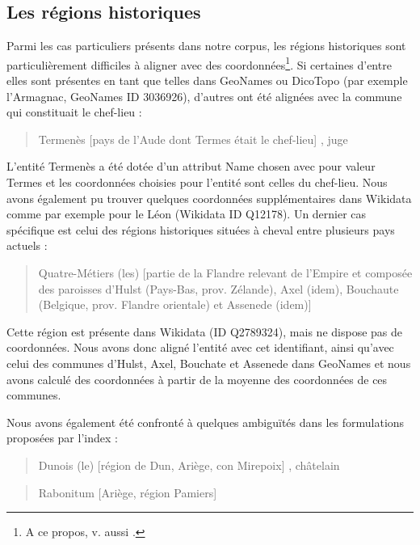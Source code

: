 \documentclass[a4paper,12pt,twoside]{book}
\begin{document}
	\subsection{Les régions historiques}
	
	Parmi les cas particuliers présents dans notre corpus, les régions historiques sont particulièrement difficiles à aligner avec des coordonnées\footnote{A ce propos, v. aussi \cite{mcdonough_named_2019}.}. Si certaines d'entre elles sont présentes en tant que telles dans GeoNames ou DicoTopo (par exemple l'Armagnac, GeoNames ID 3036926), d'autres ont été alignées avec la commune qui constituait le chef-lieu :
	
	\begin{quotation}
		Termenès [pays de l'Aude dont Termes était le chef-lieu] ,
		juge
	\end{quotation}

	\noindent L'entité \og Termenès\fg{} a été dotée d'un attribut \og Name chosen\fg{} avec pour valeur \og Termes\fg{} et les coordonnées choisies pour l'entité  sont celles du chef-lieu. Nous avons également pu trouver quelques coordonnées supplémentaires dans Wikidata comme par exemple pour le Léon (Wikidata ID  Q12178). Un dernier cas spécifique est celui des régions historiques situées à cheval entre plusieurs pays actuels :
	
	\begin{quotation}
		Quatre-Métiers (les) [partie de la Flandre relevant de l'Empire
		et composée des paroisses d'Hulst (Pays-Bas, prov. Zélande), Axel (idem),
		Bouchaute (Belgique, prov. Flandre orientale) et Assenede (idem)]
	\end{quotation}

	\noindent Cette région est présente dans Wikidata (ID Q2789324), mais ne dispose pas de coordonnées. Nous avons donc aligné l'entité avec cet identifiant, ainsi qu'avec celui des communes d'Hulst, Axel, Bouchate et Assenede dans GeoNames et nous avons calculé des coordonnées à partir de la moyenne des coordonnées de ces communes.
	
	Nous avons également été confronté à quelques ambiguïtés dans les formulations proposées par l'index :
	
	\begin{quotation}
		Dunois (le) [région de Dun, Ariège, con Mirepoix] ,
		châtelain
	\end{quotation}

	\begin{quotation}
		Rabonitum [Ariège, région Pamiers]
	\end{quotation}
\end{document}
